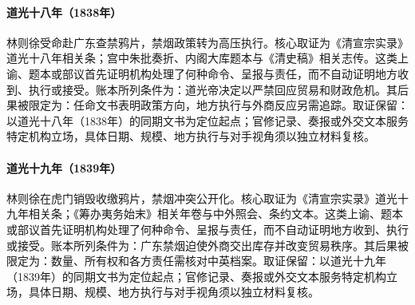 \hypertarget{ledger:EQ-1838-LIN-ZEXU-APPOINTMENT}{}\paragraph{道光十八年（1838年）}林则徐受命赴广东查禁鸦片，禁烟政策转为高压执行。核心取证为《清宣宗实录》道光十八年相关条；宫中朱批奏折、内阁大库题本与《清史稿》相关志传。这类上谕、题本或部议首先证明机构处理了何种命令、呈报与责任，而不自动证明地方收到、执行或接受。账本所列条件为：道光帝决定以严禁回应贸易和财政危机。其后果被限定为：任命文书表明政策方向，地方执行与外商反应另需追踪。取证保留：以道光十八年（1838年）的同期文书为定位起点；官修记录、奏报或外交文本服务特定机构立场，具体日期、规模、地方执行与对手视角须以独立材料复核。
\hypertarget{ledger:EQ-1839-HUMEN-OPIUM-DESTRUCTION}{}\paragraph{道光十九年（1839年）}林则徐在虎门销毁收缴鸦片，禁烟冲突公开化。核心取证为《清宣宗实录》道光十九年相关条；《筹办夷务始末》相关年卷与中外照会、条约文本。这类上谕、题本或部议首先证明机构处理了何种命令、呈报与责任，而不自动证明地方收到、执行或接受。账本所列条件为：广东禁烟迫使外商交出库存并改变贸易秩序。其后果被限定为：数量、所有权和各方责任需核对中英档案。取证保留：以道光十九年（1839年）的同期文书为定位起点；官修记录、奏报或外交文本服务特定机构立场，具体日期、规模、地方执行与对手视角须以独立材料复核。
